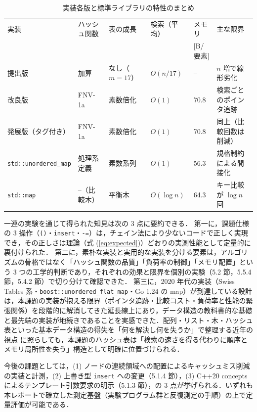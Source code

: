 \begin{table}[htbp]
\centering
\caption{実装各版と標準ライブラリの特性のまとめ}
\label{tab:summary}
{\small
\begin{tabular}{llllll}
\hline
実装 & ハッシュ関数 & 表の成長 & 検索（平均） & メモリ & 主な限界 \\
     &              &          &              & [B/要素] & \\
\hline
提出版             & 加算       & なし（$m=17$） & $O(n/17)$ & --   & $n$ 増で線形劣化 \\
改良版             & FNV-1a     & 素数倍化      & $O(1)$    & 70.8 & 検索ごとのポインタ追跡 \\
発展版（タグ付き） & FNV-1a     & 素数倍化      & $O(1)$    & 70.8 & 同上（比較回数は削減） \\
{\tt std::unordered\_map} & 処理系定義 & 素数系列 & $O(1)$ & 56.3 & 規格制約による間接化 \\
{\tt std::map}     & --（比較木） & 平衡木        & $O(\log n)$ & 64.3 & キー比較が $\log n$ 回 \\
\hline
\end{tabular}
}
\end{table}

一連の実験を通じて得られた知見は次の 3 点に要約できる．
第一に，課題仕様の 3 操作（{\tt ()}・{\tt insert}・{\tt -=}）は，チェイン法により少ないコードで正しく実現でき，その正しさは理論（式 (\ref{eq:expected})）どおりの実測性能として定量的に裏付けられた．
第二に，素朴な実装と実用的な実装を分ける要素は，アルゴリズムの骨格ではなく「ハッシュ関数の品質」「負荷率の制御」「メモリ配置」という 3 つの工学的判断であり，それぞれの効果と限界を個別の実験（5.2 節，5.5.4 節，5.4.2 節）で切り分けて確認できた．
第三に，2020 年代の実装（Swiss Tables 系・{\tt boost::unordered\_flat\_map}・Go 1.24 の map）が到達している設計は，本課題の実装が抱える限界（ポインタ追跡・比較コスト・負荷率と性能の緊張関係）を段階的に解消してきた延長線上にあり，データ構造の教科書的な基礎と最先端の実装が地続きであることを実感できた．配列・リスト・木・ハッシュ表といった基本データ構造の得失を「何を解決し何を失うか」で整理する近年の視点 \cite{zenn2026tamai} に照らしても，本課題のハッシュ表は「検索の速さを得る代わりに順序とメモリ局所性を失う」構造として明確に位置づけられる．

今後の課題としては，(1) ノードの連続領域への配置によるキャッシュミス削減の実装と計測，(2) 上書き型 {\tt insert} への変更（5.1.4 節），(3) C++20 concepts によるテンプレート引数要求の明示（5.1.3 節），の 3 点が挙げられる．いずれも本レポートで確立した測定基盤（実験プログラム群と反復測定の手順）の上で定量評価が可能である．
